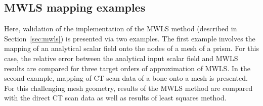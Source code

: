\documentclass[review]{elsarticle}
\numberwithin{equation}{section}
\begin{document}
\subsection{MWLS mapping examples}
\label{sec:mals_mapping}
Here, validation of the implementation of the MWLS method (described in Section~\ref{sec:mwls}) is presented via two examples.
The first example involves the mapping of an analytical scalar field onto the nodes of a mesh of a prism.
For this case, the relative error between the analytical input scalar field and MWLS results are compared for three target orders of approximation of MWLS.
In the second example, mapping of CT scan data of a bone onto a mesh is presented.
For this challenging mesh geometry, results of the MWLS method are compared with the direct CT scan data as well as results of least squares method.
    
\end{document}
